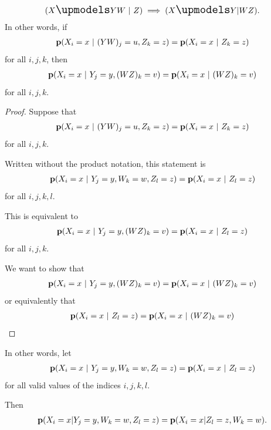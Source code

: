 \begin{theorem}
  \begin{align*}
    (X \indep YW ~|~ Z) \implies (X \indep Y | WZ).
  \end{align*}
    In other words, if
    \begin{align*}
      \mathbf{p}(X_i=x ~|~ (YW)_j=u, Z_k=z) = \mathbf{p}(X_i=x ~|~ Z_k=z)
    \end{align*}
    for all $i, j, k$, then
    \begin{align*}
      \mathbf{p}(X_i=x ~|~ Y_j=y, (WZ)_k=v) = \mathbf{p}(X_i=x ~|~ (WZ)_k=v)
    \end{align*}
    for all $i, j, k$.
\end{theorem}






\begin{proof}
  Suppose that
    \begin{align*}
      \mathbf{p}(X_i=x ~|~ (YW)_j=u, Z_k=z) = \mathbf{p}(X_i=x ~|~ Z_k=z)
    \end{align*}
    for all $i, j, k$.

    Written without the product notation, this statement is
    \begin{align*}
      \mathbf{p}(X_i=x ~|~ Y_j=y, W_k=w, Z_l=z) = \mathbf{p}(X_i=x ~|~ Z_l=z)
    \end{align*}
    for all $i, j, k, l$.

    This is equivalent to
    \begin{align*}
      \mathbf{p}(X_i=x ~|~ Y_j=y, (WZ)_k=v) = \mathbf{p}(X_i=x ~|~ Z_l=z)
    \end{align*}
    for all $i, j, k$.

    We want to show that
    \begin{align*}
      \mathbf{p}(X_i=x ~|~ Y_j=y, (WZ)_k=v) = \mathbf{p}(X_i=x ~|~ (WZ)_k=v)
    \end{align*}
    or equivalently that
    \begin{align*}
      \mathbf{p}(X_i=x ~|~ Z_l=z)  = \mathbf{p}(X_i=x ~|~ (WZ)_k=v)
    \end{align*}


\end{proof}


  In other words, let
  \begin{align*}
  \mathbf{p}(X_i=x ~|~ Y_j=y, W_k=w, Z_l=z) = \mathbf{p}(X_i=x ~|~ Z_l=z)
  \end{align*}
  for all valid values of the indices $i, j, k, l$.

  Then
  \begin{align*}
    \mathbf{p}(X_i=x|Y_j=y, W_k=w, Z_l=z) = \mathbf{p}(X_i=x|Z_l=z, W_k=w).
  \end{align*}

